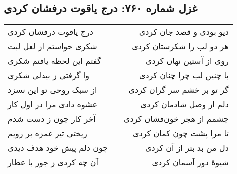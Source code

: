 \begin{center}
\section*{غزل شماره ۷۶۰: درج یاقوت درفشان کردی}
\label{sec:760}
\begin{longtable}{l p{0.5cm} r}
درج یاقوت درفشان کردی
&&
دیو بودی و قصد جان کردی
\\
شکری خواستم از لعل لبت
&&
هر دو لب را شکرستان کردی
\\
گفتم این لحظه یافتم شکری
&&
روی از آستین نهان کردی
\\
وا گرفتی ز بیدلی شکری
&&
با چنین لب چرا چنان کردی
\\
از سبک روحی تو این نسزد
&&
گر تو بر خشم سر گران کردی
\\
عشوه دادی مرا در اول کار
&&
دلم از وصل شادمان کردی
\\
آخر کار چون ز دست شدم
&&
چشمم از هجر خون‌فشان کردی
\\
ریختی تیر غمزه بر رویم
&&
تا مرا پشت چون کمان کردی
\\
چون دلم پیش خود هدف دیدی
&&
دل من بد بتر از آن کردی
\\
آن چه کردی ز جور با عطار
&&
شیوهٔ دور آسمان کردی
\\
\end{longtable}
\end{center}
